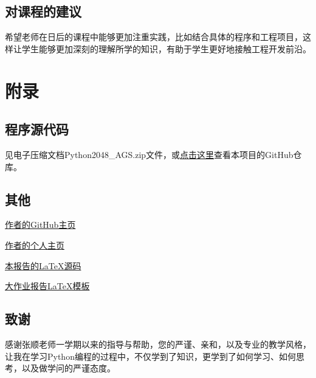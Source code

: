 \documentclass[UTF8,AutoFakeBold,AutoFakeSlant,zihao=-4]{ctexart}
\begin{document}
\subsection{对课程的建议}
希望老师在日后的课程中能够更加注重实践，比如结合具体的程序和工程项目，这样让学生能够更加深刻的理解所学的知识，有助于学生更好地接触工程开发前沿。


\clearpage
\section{附录}
\subsection{程序源代码}

见电子压缩文档Python2048\_AGS.zip文件，或\href{https://github.com/guanshuao/Python2048/}{点击这里}查看本项目的GitHub仓库。

\subsection{其他}

\href{https://github.com/guanshuao}{作者的GitHub主页}

\href{https://guanshuao.github.io/}{作者的个人主页}

\href{https://github.com/guanshuao/Python2048/tree/main/Report}{本报告的LaTeX源码}

\href{https://github.com/guanshuao/NWPU_Report}{大作业报告LaTeX模板}

\subsection{致谢}

感谢张顺老师一学期以来的指导与帮助，您的严谨、亲和，以及专业的教学风格，让我在学习Python编程的过程中，不仅学到了知识，更学到了如何学习、如何思考，以及做学问的严谨态度。
\end{document}

